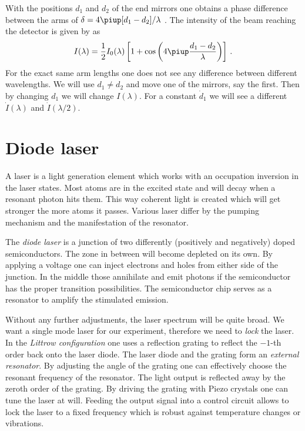 \documentclass[11pt, english, fleqn, DIV=15, headinclude, BCOR=2cm]{scrreprt}
\begin{document}
With the positions $d_1$ and $d_2$ of the end mirrors one obtains a phase
difference between the arms of $\delta = 4 \piup [d_1 - d_2] / \lambda$
\parencite[559]{meschede-gerthsen_24}. The intensity of the beam reaching the
detector is given by \textcite[559]{meschede-gerthsen_24} as
\begin{equation}
    \label{eq:I_of_lambda}
    I(\lambda) = \frac12 I_0(\lambda) \sbr{
        1 +
        \cos\del{4 \piup \frac{d_1 - d_2}{\lambda}}
    } \,.
\end{equation}
For the exact same arm lengths one does not see any difference between
different wavelengths. We will use $d_1 \neq d_2$ and move one of the mirrors,
say the first. Then by changing $d_1$ we will change $I(\lambda)$. For a
constant $\dot d_1$ we will see a different $\dot I(\lambda)$ and $\dot
I(\lambda/2)$.


\section{Diode laser}
\label{sec:diode_laser}

A laser is a light generation element which works with an occupation inversion
in the laser states. Most atoms are in the excited state and will decay when a
resonant photon hits them. This way coherent light is created which will get
stronger the more atoms it passes. Various laser differ by the pumping
mechanism and the manifestation of the resonator.

The \emph{diode laser} is a junction of two differently (positively and
negatively) doped semiconductors. The zone in between will become depleted on
its own. By applying a voltage one can inject electrons and holes from either
side of the junction. In the middle those annihilate and emit photons if the
semiconductor has the proper transition possibilities. The semiconductor chip
serves as a resonator to amplify the stimulated emission.

Without any further adjustments, the laser spectrum will be quite broad. We
want a single mode laser for our experiment, therefore we need to \emph{lock}
the laser. In the \emph{Littrow configuration} one uses a reflection grating to
reflect the $-1$-th order back onto the laser diode. The laser diode and the
grating form an \emph{external resonator}. By adjusting the angle of the
grating one can effectively choose the resonant frequency of the resonator. The
light output is reflected away by the zeroth order of the grating. By driving
the grating with Piezo crystals one can tune the laser at will. Feeding the
output signal into a control circuit allows to lock the laser to a fixed
frequency which is robust against temperature changes or vibrations.
\end{document}
